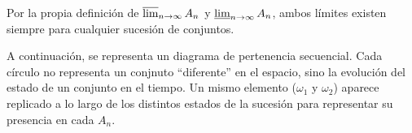 \begin{observacion}
Por la propia definición de $\varlimsup_{n \to \infty} A_n$ y $\varliminf_{n \to \infty} A_n$, ambos límites existen siempre para cualquier sucesión de conjuntos.
\end{observacion}

\newpage

\noindent
A continuación, se representa un diagrama de pertenencia secuencial. Cada círculo no representa un conjnuto ``diferente'' en el espacio, sino la evolución del estado de un conjunto en el tiempo. Un mismo elemento ($\omega_1$ y $\omega_2$) aparece replicado a lo largo de los distintos estados de la sucesión para representar su presencia en cada $A_n$.

